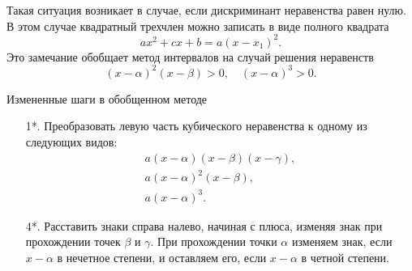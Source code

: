 \documentclass[algebra,twocolumn]{pum}
\begin{document}
Такая ситуация возникает в случае, если дискриминант неравенства равен нулю. В этом случае квадратный трехчлен можно записать в виде полного квадрата 
$$ax^2+cx+b=a(x-x_1)^2.$$
Это замечание обобщает метод интервалов на случай решения неравенств
$$(x-\alpha)^2(x-\beta)>0,\quad (x-\alpha)^3>0.$$
\begin{pumbox}{Измененные шаги в обобщенном методе}
  \begin{enumerate}
    \item[1*.] Преобразовать левую часть кубического неравенства к одному из следующих видов:
      \begin{gather*}
        a(x-\alpha)(x-\beta)(x-\gamma), \\
        a(x-\alpha)^2 (x-\beta), \\
        a(x-\alpha)^3.
      \end{gather*}
    \item[4*.] Расставить знаки справа налево, начиная с плюса, изменяя знак при прохождении точек $\beta$ и $\gamma$. При прохождении точки $\alpha$ изменяем знак, если $x-\alpha$ в нечетное степени, и оставляем его, если $x-\alpha$ в четной степени.
  \end{enumerate}
\end{pumbox}
\end{document}
